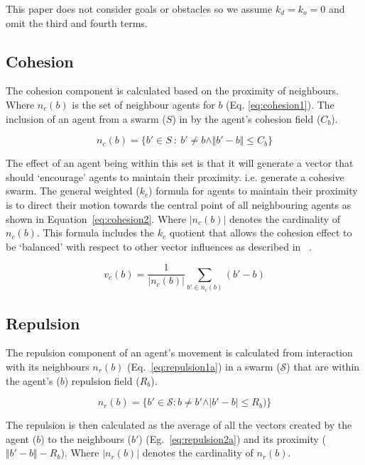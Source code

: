 \documentclass[12pt,a4paper]{IEEEtran}
\newcommand{\magn}[1]{\Vert{#1}\Vert}
\newcommand{\card}[1]{\vert{#1}\vert}
\newcommand{\vbb}[2]{#2-#1}
\begin{document}
This paper does not consider goals or obstacles so we assume $k_d = k_o = 0$ and omit the third and fourth terms.

\subsection{Cohesion}\label{cohesion}
The cohesion component is calculated based on the proximity of neighbours. Where $n_c(b)$ is the set of neighbour agents for $b$ (Eq. \ref{eq:cohesion1}). The inclusion of an agent from a swarm ($S$) in by the agent's cohesion field ($C_b$).

\begin{equation}\label{eq:cohesion1}
n_c(b) = \{b' \in S~:~b' \neq b \land\magn{\vbb{b}{b'}} \leq C_b\}
\end{equation}

The effect of an agent being within this set is that it will generate a vector that should `encourage' agents to maintain their proximity. i.e. generate a cohesive swarm. The general weighted ($k_c$) formula for agents to maintain their proximity is to direct their motion towards the central point of all neighbouring agents as shown in Equation~\ref{eq:cohesion2}. Where $\card{n_c(b)}$ denotes the cardinality of $n_c(b)$. This formula includes the $k_c$ quotient that allows the cohesion effect to be `balanced' with respect to other vector influences as described in ~\cite{eliot2017methods,eliot2018metric,eliot2019void}. 

\begin{equation}\label{eq:cohesion2}
v_c(b) = \frac{1}{\card{n_c(b)}} \sum_{b' \in n_c(b)}(\vbb{b}{b'})
\end{equation}

\subsection{Repulsion}\label{repulsion:neighbours}
The repulsion component of an agent's movement is calculated from interaction with its neighbours $n_r(b)$ (Eq.~\ref{eq:repulsion1a}) in a swarm ($\mathcal{S}$) that are within the agent's ($b$) repulsion field ($R_b$).

\begin{equation}\label{eq:repulsion1a}
n_r(b) = \{b' \in \mathcal{S} : b \neq b' \land \card{\vbb{b}{b'}} \leq R_b)\}
\end{equation}

The repulsion is then calculated as the average of all the vectors created by the agent ($b$) to the neighbours ($b'$) (Eg.~\ref{eq:repulsion2a}) and its proximity ($\magn{\vbb{b}{b'}} - R_b$). Where $\card{n_r(b)}$ denotes the cardinality of $n_r(b)$.
\end{document}
